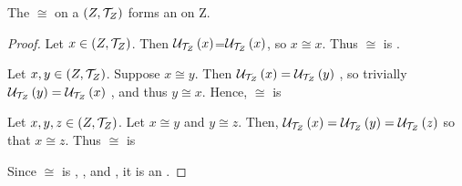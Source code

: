 
\begin{prop}[\RelationOfEqualNeighborhoodFilters]
    \label{prop:EqualNeighborhoodFiltersEquivalenceRelation}
    
    The
	\RelationOfEqualNeighborhoodFilters
	$\cong$ on a \TopologicalSpaceRef $(Z,\mathcal{T}_Z)$ forms an 
	\EquivalenceRelation	
	on Z. 
    \begin{proof}
        
        Let $x \in (Z,\mathcal{T}_Z)$. 
        Then $\mathcal{U}_{\mathcal{T}_{Z}}\left( x\right)$=$\mathcal{U}_{\mathcal{T}_{Z}}\left( x\right)$, so $x \cong x$.
        Thus $\cong$ is 
		\ReflexiveRelation. 
        
        Let $x,y \in (Z,\mathcal{T}_Z)$. 
        Suppose $x \cong y$. 
        Then  $\mathcal{U}_{\mathcal{T}_{Z}}\left( x\right) = \mathcal{U}_{\mathcal{T}_{Z}}\left( y\right)$
        , so trivially  $\mathcal{U}_{\mathcal{T}_{Z}}\left( y\right) =\mathcal{U}_{\mathcal{T}_{Z}}\left( x\right)$
        , and thus $y \cong x$.
        Hence, $\cong$ is 
		\SymmetricRelation
        
        Let $x,y,z \in (Z,\mathcal{T}_Z)$.
        Let $x \cong y$ and $y \cong z$. 
        Then, 
         $\mathcal{U}_{\mathcal{T}_{Z}}\left( x\right)= \mathcal{U}_{\mathcal{T}_{Z}}\left( y\right) =  \mathcal{U}_{\mathcal{T}_{Z}}\left( z\right)$
         so that $x \cong z$.
         Thus $\cong$ is \TransitiveRelation
         
         Since $\cong$ is 
		 \ReflexiveRelation
		, \SymmetricRelation
		, and \TransitiveRelation, it is an 
		\EquivalenceRelation. 
        
    \end{proof}
\end{prop}